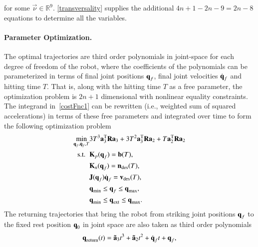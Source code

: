 %
\noindent for some $\vec{\nu} \in \mathbb{R}^{9}$. \eqref{transversality} supplies the additional $4n + 1 - 2n - 9 = 2n - 8$ equations to determine all the variables.
%
\paragraph{\textbf{Parameter Optimization}.} The optimal trajectories are third order polynomials in joint-space for each degree of freedom of the robot, where the coefficients of the polynomials can be parameterized in terms of final joint positions $\boldsymbol{\mathrm{q}}_f$, final joint velocities $\dot{\boldsymbol{\mathrm{q}}}_f$ and hitting time $T$. That is, along with the hitting time $T$ as a free parameter, the optimization problem is $2n+1$ dimensional with nonlinear equality constraints. The integrand in~\eqref{costFnc1} can be rewritten (i.e., weighted sum of squared accelerations) in terms of these free parameters and integrated over time to form the following optimization problem
%
\begin{align} %
\min_{\joint_f,\dot{\joint}_f, T} & 3T^3 \vec{a}_3^{\mathrm{T}}\vec{R}\vec{a}_3 + 3T^2 \vec{a}_3^{\mathrm{T}}\vec{R}\vec{a}_2  +  T\vec{a}_2^{\mathrm{T}}\vec{R}\vec{a}_2 \label{costFnc3} \\
\textrm{s.t. \ }
& \kin_p(\joint_f) = \ballPred(T), \\
& \kin_n(\joint_f) = \normal_{\mathrm{des}}(T), \\
&\jac(\joint_f)\dot{\joint}_f = \racketVel_{\mathrm{des}}(T), \\
& \jointMin \leq \joint_f \leq \jointMax, \label{jointLimPointwise}\\
& \jointMin \leq \joint_{\mathrm{ext}} \leq \jointMax \label{jointLimTraj}.
\end{align}
%
The returning trajectories that bring the robot from striking joint positions $\boldsymbol{\mathrm{q}}_f$ to the fixed rest position $\boldsymbol{\mathrm{q}}_0$ in joint space are also taken as third order polynomials
%
\begin{align}
\boldsymbol{\mathrm{q}}_{\mathrm{return}}(t)= \boldsymbol{\mathrm{\tilde{a}}}_3 t^3  + \boldsymbol{\mathrm{\tilde{a}}}_2 t^2 + \dot{\boldsymbol{\mathrm{q}}}_f t + \boldsymbol{\mathrm{q}}_f, \label{returnTraj}
\end{align}
